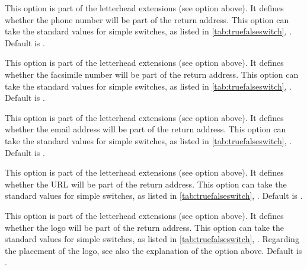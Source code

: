 \begin{Declaration}
\end{Declaration}
%
This option is part of the letterhead extensions (see option
 above). It defines whether the phone number will be
part of the return address.  This option can take the standard values
for simple switches, as listed in
\autoref{tab:truefalseswitch},
. Default is
.
%
%

\begin{Declaration}
\end{Declaration}
%
This option is part of the letterhead extensions (see option
 above). It defines whether the facsimile number
will be part of the return address.  This option can take the standard
values for simple switches, as listed in
\autoref{tab:truefalseswitch},
. Default is
.
%
%

\begin{Declaration}
\end{Declaration}
%
This option is part of the letterhead extensions (see option
 above). It defines whether the
email address will be part of the return address.  This option can take
the standard values for simple switches, as listed in
\autoref{tab:truefalseswitch},
. Default is .
%
%

\begin{Declaration}
\end{Declaration}
%
This option is part of the letterhead extensions (see option
 above). It defines whether the
URL will be part of the return address.  This option can take
the standard values for simple switches, as listed in
\autoref{tab:truefalseswitch},
. Default is .
%
%

\begin{Declaration}
\end{Declaration}
%
This option is part of the letterhead extensions (see option
 above). It defines whether the logo will be part of
the return address.  This option can take the standard values for
simple switches, as listed in
\autoref{tab:truefalseswitch},
. Regarding the placement
of the logo, see also the explanation of the option 
above. Default is .
%
%


